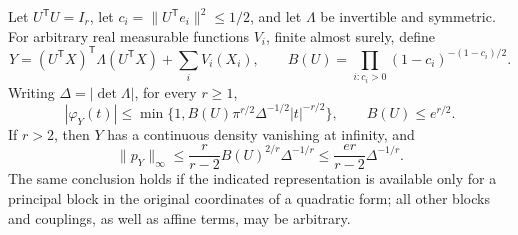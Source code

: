 \begin{theorem}
\label{four:diffuse}
Let \(U^{\mathsf T}U=I_r\), let
\(c_i=\|U^{\mathsf T}e_i\|^2\leq1/2\), and let
\(\Lambda\) be invertible and symmetric.  For arbitrary real
measurable functions \(V_i\), finite almost surely, define
\[
 Y=(U^{\mathsf T}X)^{\mathsf T}\Lambda(U^{\mathsf T}X)
          +\sum_iV_i(X_i),\qquad
 B(U)=\prod_{i:c_i>0}(1-c_i)^{-(1-c_i)/2}.
\]
Writing \(\Delta=|\det\Lambda|\), for every \(r\geq1\),
\begin{equation}\label{four:diffuse-decay}
 |\varphi_Y(t)|
 \leq\min\{1,B(U)\pi^{r/2}\Delta^{-1/2}|t|^{-r/2}\},
 \qquad B(U)\leq e^{r/2}.
\end{equation}
If \(r>2\), then \(Y\) has a continuous density vanishing at infinity,
and
\begin{equation}\label{four:diffuse-density}
 \|p_Y\|_\infty
 \leq\frac r{r-2}B(U)^{2/r}\Delta^{-1/r}
 \leq\frac{er}{r-2}\Delta^{-1/r}.
\end{equation}
The same conclusion holds if the indicated representation is available
only for a principal block in the original coordinates of a quadratic
form; all other blocks and couplings, as well as affine terms, may be
arbitrary.
\end{theorem}
